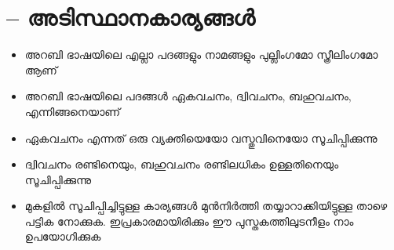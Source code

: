 \chapter{\textarabic{ } -- \textmalayalam{അടിസ്ഥാനകാര്യങ്ങൾ}}

\begin{itemize}	    \setlength{\itemsep}{5pt}
\item അറബി ഭാഷയിലെ എല്ലാ പദങ്ങളും നാമങ്ങളും പുല്ലിംഗമോ സ്ത്രീലിംഗമോ ആണ് 
\item അറബി ഭാഷയിലെ പദങ്ങൾ ഏകവചനം, ദ്വിവചനം, ബഹുവചനം, എന്നിങ്ങനെയാണ് 
\item ഏകവചനം എന്നത് ഒരു വ്യക്തിയെയോ വസ്തുവിനെയോ സൂചിപ്പിക്കുന്നു 
\item ദ്വിവചനം രണ്ടിനെയും, ബഹുവചനം രണ്ടിലധികം ഉള്ളതിനെയും സൂചിപ്പിക്കുന്നു 
\item മുകളിൽ സൂചിപ്പിച്ചിട്ടുള്ള കാര്യങ്ങൾ മുൻനിർത്തി തയ്യാറാക്കിയിട്ടുള്ള താഴെ പട്ടിക നോക്കുക. ഇപ്രകാരമായിരിക്കും  ഈ പുസ്തകത്തിലുടനീളം  നാം ഉപയോഗിക്കുക
\end{itemize}

